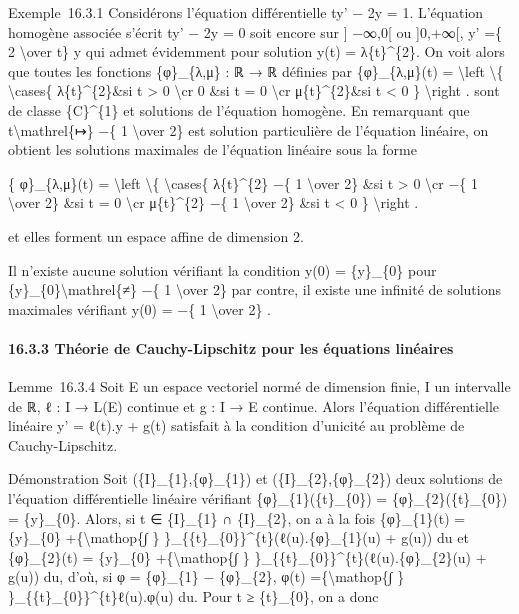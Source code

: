 \documentclass[]{article}
\begin{document}
Exemple~16.3.1 Considérons l'équation différentielle ty' − 2y = 1.
L'équation homogène associée s'écrit ty' − 2y = 0 soit encore sur {]}
−∞,0{[} ou {]}0,+∞{[}, y' =\{ 2 \textbackslash{}over t\} y qui admet
évidemment pour solution y(t) = λ\{t\}\^{}\{2\}. On voit alors que
toutes les fonctions \{φ\}\_\{λ,μ\} : ℝ → ℝ définies par
\{φ\}\_\{λ,μ\}(t) = \textbackslash{}left \textbackslash{}\{
\textbackslash{}cases\{ λ\{t\}\^{}\{2\}\&si t \textgreater{} 0
\textbackslash{}cr 0 \&si t = 0 \textbackslash{}cr μ\{t\}\^{}\{2\}\&si t
\textless{} 0 \} \textbackslash{}right . sont de classe \{C\}\^{}\{1\}
et solutions de l'équation homogène. En remarquant que
t\textbackslash{}mathrel\{↦\} −\{ 1 \textbackslash{}over 2\} est
solution particulière de l'équation linéaire, on obtient les solutions
maximales de l'équation linéaire sous la forme

\{ φ\}\_\{λ,μ\}(t) = \textbackslash{}left \textbackslash{}\{
\textbackslash{}cases\{ λ\{t\}\^{}\{2\} −\{ 1 \textbackslash{}over 2\}
\&si t \textgreater{} 0 \textbackslash{}cr −\{ 1 \textbackslash{}over
2\} \&si t = 0 \textbackslash{}cr μ\{t\}\^{}\{2\} −\{ 1
\textbackslash{}over 2\} \&si t \textless{} 0 \} \textbackslash{}right .

et elles forment un espace affine de dimension 2.

Il n'existe aucune solution vérifiant la condition y(0) = \{y\}\_\{0\}
pour \{y\}\_\{0\}\textbackslash{}mathrel\{≠\} −\{ 1 \textbackslash{}over
2\} par contre, il existe une infinité de solutions maximales vérifiant
y(0) = −\{ 1 \textbackslash{}over 2\} .

\paragraph{16.3.3 Théorie de Cauchy-Lipschitz pour les équations
linéaires}

Lemme~16.3.4 Soit E un espace vectoriel normé de dimension finie, I un
intervalle de ℝ, ℓ : I → L(E) continue et g : I → E continue. Alors
l'équation différentielle linéaire y' = ℓ(t).y + g(t) satisfait à la
condition d'unicité au problème de Cauchy-Lipschitz.

Démonstration Soit (\{I\}\_\{1\},\{φ\}\_\{1\}) et
(\{I\}\_\{2\},\{φ\}\_\{2\}) deux solutions de l'équation différentielle
linéaire vérifiant \{φ\}\_\{1\}(\{t\}\_\{0\}) =
\{φ\}\_\{2\}(\{t\}\_\{0\}) = \{y\}\_\{0\}. Alors, si t ∈ \{I\}\_\{1\} ∩
\{I\}\_\{2\}, on a à la fois \{φ\}\_\{1\}(t) = \{y\}\_\{0\}
+\{\textbackslash{}mathop\{∫ \}
\}\_\{\{t\}\_\{0\}\}\^{}\{t\}(ℓ(u).\{φ\}\_\{1\}(u) + g(u)) du et
\{φ\}\_\{2\}(t) = \{y\}\_\{0\} +\{\textbackslash{}mathop\{∫ \}
\}\_\{\{t\}\_\{0\}\}\^{}\{t\}(ℓ(u).\{φ\}\_\{2\}(u) + g(u)) du, d'où, si
φ = \{φ\}\_\{1\} − \{φ\}\_\{2\}, φ(t) =\{\textbackslash{}mathop\{∫ \}
\}\_\{\{t\}\_\{0\}\}\^{}\{t\}ℓ(u).φ(u) du. Pour t ≥ \{t\}\_\{0\}, on a
donc
\end{document}

